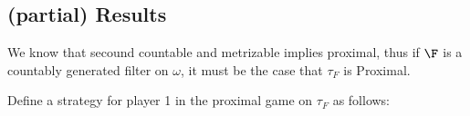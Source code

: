 \documentclass{article}
\begin{document}
\subsection{(partial) Results}

We know that secound countable and metrizable implies proximal, thus if \(\F\) is a countably generated filter on \(\omega\), it must be the case that \(\tau_F\) is Proximal. 

Define a strategy for player 1 in the proximal game on \(\tau_F\) as follows:

%
\end{document}
